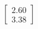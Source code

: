 \documentclass[preview]{standalone}
\begin{document}
\begin{align*}
\begin{bmatrix} 2.60 \\ 3.38 \end{bmatrix}
\end{align*}
\end{document}
